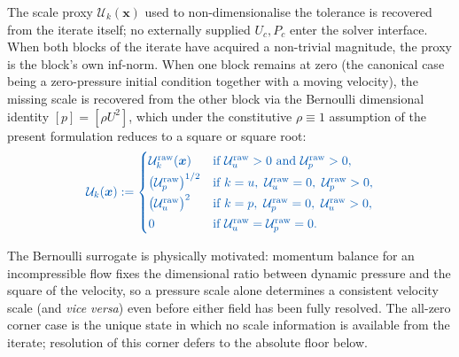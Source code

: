 \documentclass{article}
\newcommand{\extline}[1]{{\color{extcolor}#1}}
\begin{document}
\extline{The scale proxy $\mathcal{U}_{k}(\boldsymbol{x})$ used to
non-dimensionalise the tolerance is recovered from the iterate
itself; no externally supplied $U_{c}, P_{c}$ enter the solver
interface. When both blocks of the iterate have acquired a
non-trivial magnitude, the proxy is the block's own inf-norm. When
one block remains at zero (the canonical case being a zero-pressure
initial condition together with a moving velocity), the missing scale
is recovered from the other block via the Bernoulli dimensional
identity $[p] = [\rho U^{2}]$, which under the constitutive
$\rho \equiv 1$ assumption of the present formulation reduces to a
square or square root:}
\begin{equation}
    \label{eq:per-field-scale-resolve}
    \textcolor{extcolor}{
    \mathcal{U}_{k}(\boldsymbol{x}) :=
    \begin{cases}
        \mathcal{U}_{k}^{\mathrm{raw}}(\boldsymbol{x})
            & \text{if } \mathcal{U}_{u}^{\mathrm{raw}}>0 \ \text{and}\ \mathcal{U}_{p}^{\mathrm{raw}}>0, \\[2pt]
        \bigl(\mathcal{U}_{p}^{\mathrm{raw}}\bigr)^{1/2}
            & \text{if } k = u,\ \mathcal{U}_{u}^{\mathrm{raw}} = 0,\ \mathcal{U}_{p}^{\mathrm{raw}} > 0, \\[2pt]
        \bigl(\mathcal{U}_{u}^{\mathrm{raw}}\bigr)^{2}
            & \text{if } k = p,\ \mathcal{U}_{p}^{\mathrm{raw}} = 0,\ \mathcal{U}_{u}^{\mathrm{raw}} > 0, \\[2pt]
        0
            & \text{if } \mathcal{U}_{u}^{\mathrm{raw}} = \mathcal{U}_{p}^{\mathrm{raw}} = 0.
    \end{cases}}
\end{equation}

\extline{The Bernoulli surrogate is physically motivated: momentum
balance for an incompressible flow fixes the dimensional ratio
between dynamic pressure and the square of the velocity, so a
pressure scale alone determines a consistent velocity scale (and
\emph{vice versa}) even before either field has been fully resolved.
The all-zero corner case is the unique state in which no scale
information is available from the iterate; resolution of this corner
defers to the absolute floor below.}
\end{document}
